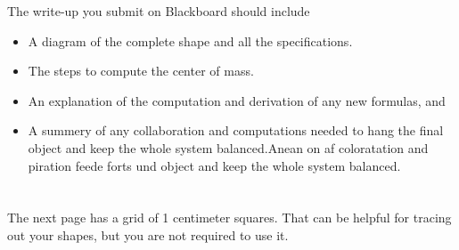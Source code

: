 \documentclass[a4paper,10pt]{article}
\begin{document}
The write-up you submit on Blackboard should include
\begin{itemize}
\item A diagram of the complete shape and all the specifications.
\item The steps to compute the center of mass.
\item An explanation of the computation and derivation of any new formulas, and
\item A summery of any collaboration and computations needed to hang the final object and keep the whole system balanced.Anean on af coloratation and piration feede forts und object and keep the whole system balanced.
\end{itemize}

\section*{}
The next page has a grid of 1 centimeter squares. That can be helpful for tracing out your shapes, but you are not required to use it.
\end{document}
